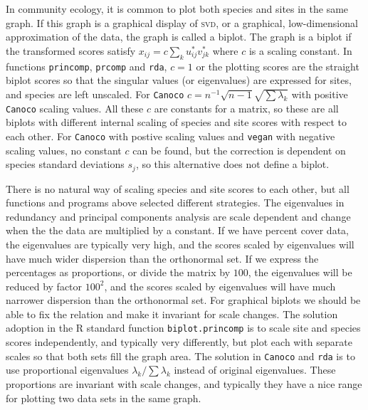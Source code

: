 \documentclass[a4paper]{article}
\begin{document}
In community ecology, it is common to plot both species and sites in
the same graph.  If this graph is a graphical display of \textsc{svd},
or a graphical, low-dimensional approximation of the data, the graph
is called a biplot.  The graph is a biplot if the transformed scores
satisfy $x_{ij} = c \sum_k u_{ij}^* v_{jk}^*$ where $c$ is a scaling
constant.  In functions \texttt{princomp}, \texttt{prcomp} and
\texttt{rda}, $c=1$ or the plotting scores are the straight biplot
scores so that the singular values (or eigenvalues) are expressed for
sites, and species are left unscaled.  For \texttt{Canoco} $c = n^{-1}
\sqrt{n-1} \sqrt{\sum \lambda_k}$ with positive \texttt{Canoco}
scaling values. All these $c$ are constants for a matrix, so these are
all biplots with different internal scaling of species and site scores
with respect to each other.  For \texttt{Canoco} with postive scaling
values and \texttt{vegan} with negative scaling values, no constant
$c$ can be found, but the correction is dependent on species standard
deviations $s_j$, so this alternative does not define a biplot.

There is no natural way of scaling species and site scores to each
other, but all functions and programs above selected different
strategies.  The eigenvalues in redundancy and principal components
analysis are scale dependent and change when the the data are
multiplied by a constant.  If we have percent cover data, the
eigenvalues are typically very high, and the scores scaled by
eigenvalues will have much wider dispersion than the orthonormal set.
If we express the percentages as proportions, or divide the matrix by
$100$, the eigenvalues will be reduced by factor $100^2$, and the
scores scaled by eigenvalues will have much narrower dispersion than
the orthonormal set.  For graphical biplots we should be able to fix
the relation and make it invariant for scale changes.  The solution
adoption in the R standard function \texttt{biplot.princomp} is to
scale site and species scores independently, and typically very
differently, but plot each with separate scales so that both sets fill
the graph area.  The solution in \texttt{Canoco} and \texttt{rda} is
to use proportional eigenvalues $\lambda_k / \sum \lambda_k$ instead
of original eigenvalues.  These proportions are invariant with scale
changes, and typically they have a nice range for plotting two data
sets in the same graph.
\end{document}
